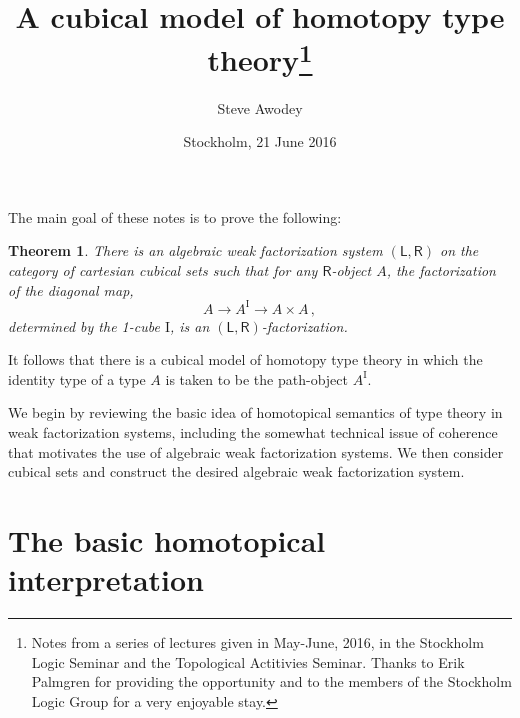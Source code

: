 \documentclass[12pt]{article}
\newcommand{\I}{\ensuremath{\mathrm{I}}}
\newtheorem*{theorem*}{Theorem}
\theoremstyle{remark}
\theoremstyle{definition}
\begin{document}

\title{A cubical model of homotopy type theory\thanks{
Notes from a series of lectures given in May-June, 2016, in the Stockholm Logic Seminar and the Topological Actitivies Seminar.  Thanks to Erik Palmgren for providing the opportunity and to the members of the Stockholm Logic Group for a very enjoyable stay.}
}
\author{Steve Awodey
}
\date{Stockholm, 21 June 2016}

\maketitle
\noindent
The main goal of these notes is to prove the following:

\begin{theorem*}
There is an algebraic weak factorization system $(\mathsf{L}, \mathsf{R})$ on the category of cartesian cubical sets such that for any $\mathsf{R}$-object $A$, the factorization of the diagonal map,
\[
A \to A^\I \to A\times  A\,,
\]
determined by the 1-cube $\I$, is an $(\mathsf{L}, \mathsf{R})$-factorization.
\end{theorem*}

\noindent It follows that there is a cubical model of homotopy type theory in which the identity type of a type $A$ is taken to be the path-object $A^\I$.

We begin by reviewing the basic idea of homotopical semantics of type theory in weak factorization systems, including the somewhat technical issue of coherence that motivates the use of algebraic weak factorization systems. We then consider cubical sets and construct the desired algebraic weak factorization system.

\section{The basic homotopical interpretation}
\end{document}
